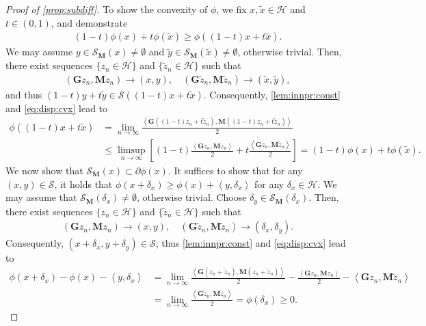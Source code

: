 \documentclass[noinfoline]{imsart}\setcounter{tocdepth}{2}
\newcommand{\m}[1]{\mathbf{#1}} %
\renewcommand{\c}[1]{\mathcal{#1}} %
\newcommand{\innpr}[2]{{\left\langle {#1},{#2}\right\rangle}} %
\theoremstyle{plain}
\begin{document}
\begin{proof}[Proof of \cref{prop:subdiff}]
To show the convexity of $\phi$, we fix $x, \tilde{x} \in \c{H}$ and $t \in (0, 1)$, and demonstrate
\begin{align*}
    (1-t) \phi(x) + t \phi(\tilde{x}) \ge \phi((1-t)x + t \tilde{x}).
\end{align*}
We may assume $y \in \c{S}_{\m{M}}(x) \ne \emptyset$ and $\tilde{y} \in \c{S}_{\m{M}}(\tilde{x}) \ne \emptyset$, otherwise trivial. Then, there exist sequences $\{z_{n} \in \c{H}\}$ and $\{\tilde{z}_{n} \in \c{H}\}$ such that 
\begin{align*}
    (\m{G} z_{n}, \m{M} z_{n}) \to (x, y), \quad (\m{G} \tilde{z}_{n}, \m{M} \tilde{z}_{n}) \to (\tilde{x}, \tilde{y}),
\end{align*}
and thus $(1-t) y + t \tilde{y} \in \c{S}((1-t)x + t \tilde{x})$. Consequently, \cref{lem:innpr:const} and \eqref{eq:disp:cvx} lead to
\begin{align*}
    \phi((1-t)x + t \tilde{x}) &= \lim_{n \to \infty} \frac{\innpr{\m{G}((1-t)z_{n} + t \tilde{z}_{n})}{\m{M}((1-t)z_{n} + t \tilde{z}_{n})}}{2} \\
    &\le \limsup_{n \to \infty} \left[ (1-t) \frac{\innpr{\m{G} z_{n}}{\m{M} z_{n}}}{2} + t \frac{\innpr{\m{G} \tilde{z}_{n}}{\m{M} \tilde{z}_{n}}}{2} \right] = (1-t) \phi(x) + t \phi(\tilde{x}).
\end{align*}
We now show that $\c{S}_{\m{M}}(x) \subset \partial \phi(x)$. It suffices to show that for any $(x, y) \in \c{S}$, it holds that $\phi(x+\delta_{x}) \ge \phi(x) + \innpr{y}{\delta_{x}}$ for any $\delta_{x} \in \c{H}$. We may assume that $\c{S}_{\m{M}}(\delta_{x}) \ne \emptyset$, otherwise trivial. Choose $\delta_{y} \in \c{S}_{\m{M}}(\delta_{x})$. Then, there exist sequences $\{z_{n} \in \c{H}\}$ and $\{\tilde{z}_{n} \in \c{H}\}$ such that 
\begin{align*}
    (\m{G} z_{n}, \m{M} z_{n}) \to (x, y), \quad (\m{G} \tilde{z}_{n}, \m{M} \tilde{z}_{n}) \to (\delta_{x}, \delta_{y}).
\end{align*}
Consequently, $(x+\delta_{x}, y+\delta_{y}) \in \c{S}$, thus \cref{lem:innpr:const} and \eqref{eq:disp:cvx} lead to
\begin{align*}
    \phi(x+\delta_{x}) - \phi(x) - \innpr{y}{\delta_{x}} &= \lim_{n \to \infty} \frac{\innpr{\m{G} (z_{n} + \tilde{z}_{n})}{\m{M} (z_{n} + \tilde{z}_{n})}}{2} - \frac{\innpr{\m{G} z_{n}}{\m{M} z_{n}}}{2} - \innpr{\m{G} z_{n}}{\m{M} \tilde{z}_{n}} \\
    &= \lim_{n \to \infty} \frac{\innpr{\m{G} \tilde{z}_{n}}{\m{M} \tilde{z}_{n}}}{2} = \phi(\delta_{x}) \ge 0.
\end{align*}
\end{proof}
\end{document}
